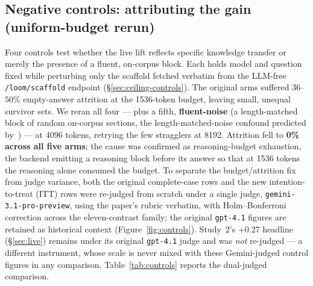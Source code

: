 \documentclass[10pt,twocolumn]{article}
\begin{document}
\subsection{Negative controls: attributing the gain (uniform-budget rerun)}\label{sec:controls}
Four controls test whether the live lift reflects specific knowledge transfer or merely the presence of a fluent, on-corpus block. Each holds model and question fixed while perturbing only the scaffold fetched verbatim from the LLM-free \texttt{/loom/scaffold} endpoint (\S\ref{sec:ceiling-controls}). The original arms suffered $36$--$50\%$ empty-answer attrition at the 1536-token budget, leaving small, unequal survivor sets. We reran all four --- plus a fifth, \textbf{fluent-noise} (a length-matched block of random on-corpus sections, the length-matched-noise confound predicted by~\textcite{cuconasu2024poweofnoise}) --- at 4096 tokens, retrying the few stragglers at 8192. Attrition fell to \textbf{0\% across all five arms}; the cause was confirmed as reasoning-budget exhaustion, the backend emitting a reasoning block before its answer so that at 1536 tokens the reasoning alone consumed the budget. To separate the budget/attrition fix from judge variance, both the original complete-case rows and the new intention-to-treat (ITT) rows were re-judged from scratch under a single judge, \texttt{gemini-3.1-pro-preview}, using the paper's rubric verbatim, with Holm--Bonferroni correction across the eleven-contrast family; the original \texttt{gpt-4.1} figures are retained as historical context (Figure~\ref{fig:controls}). Study~2's $+0.27$ headline (\S\ref{sec:live}) remains under its original \texttt{gpt-4.1} judge and was \emph{not} re-judged --- a different instrument, whose scale is never mixed with these Gemini-judged control figures in any comparison. Table~\ref{tab:controls} reports the dual-judged comparison.


\end{document}
